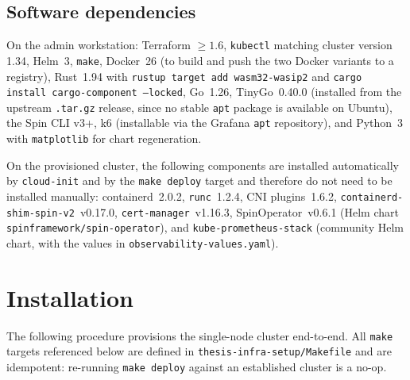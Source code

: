 \subsection{Software dependencies}
\label{sec:repro_software}

\begin{sloppypar}
On the admin workstation: Terraform $\geq 1.6$, \texttt{kubectl} matching cluster version 1.34, Helm~3, \texttt{make}, Docker~26 (to build and push the two Docker variants to a registry), Rust~1.94 with \texttt{rustup target add wasm32-wasip2} and \texttt{cargo install cargo-component --locked}, Go~1.26, TinyGo~0.40.0 (installed from the upstream \texttt{.tar.gz} release, since no stable \texttt{apt} package is available on Ubuntu), the Spin \acs{CLI} v3+, k6 (installable via the Grafana \texttt{apt} repository), and Python~3 with \texttt{matplotlib} for chart regeneration.
\end{sloppypar}

\begin{sloppypar}
On the provisioned cluster, the following components are installed automatically by \texttt{cloud-init} and by the \texttt{make deploy} target and therefore do not need to be installed manually: containerd~2.0.2, \texttt{runc}~1.2.4, CNI plugins~1.6.2, \texttt{containerd-shim-spin-v2}~v0.17.0, \texttt{cert-manager}~v1.16.3, SpinOperator~v0.6.1 (Helm chart \texttt{spinframework/spin-operator}), and \texttt{kube-prometheus-stack} (community Helm chart, with the values in \texttt{observability-values.yaml}).
\end{sloppypar}

\section{Installation}
\label{sec:repro_installation}

\begin{sloppypar}
The following procedure provisions the single-node cluster end-to-end. All \texttt{make} targets referenced below are defined in \texttt{thesis-infra-setup/Makefile} and are idempotent: re-running \texttt{make deploy} against an established cluster is a no-op.
\end{sloppypar}

